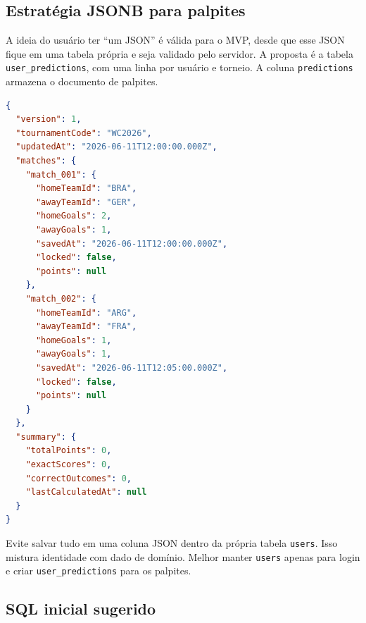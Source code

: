 \documentclass[12pt,a4paper]{article}
\begin{document}
\subsection{Estratégia JSONB para palpites}

A ideia do usuário ter ``um JSON'' é válida para o MVP, desde que esse JSON fique em uma tabela própria e seja validado pelo servidor. A proposta é a tabela \texttt{user\_predictions}, com uma linha por usuário e torneio. A coluna \texttt{predictions} armazena o documento de palpites.

\begin{lstlisting}[language=json,caption={Formato proposto do JSON de palpites}]
{
  "version": 1,
  "tournamentCode": "WC2026",
  "updatedAt": "2026-06-11T12:00:00.000Z",
  "matches": {
    "match_001": {
      "homeTeamId": "BRA",
      "awayTeamId": "GER",
      "homeGoals": 2,
      "awayGoals": 1,
      "savedAt": "2026-06-11T12:00:00.000Z",
      "locked": false,
      "points": null
    },
    "match_002": {
      "homeTeamId": "ARG",
      "awayTeamId": "FRA",
      "homeGoals": 1,
      "awayGoals": 1,
      "savedAt": "2026-06-11T12:05:00.000Z",
      "locked": false,
      "points": null
    }
  },
  "summary": {
    "totalPoints": 0,
    "exactScores": 0,
    "correctOutcomes": 0,
    "lastCalculatedAt": null
  }
}
\end{lstlisting}

\begin{riskbox}
Evite salvar tudo em uma coluna JSON dentro da própria tabela \texttt{users}. Isso mistura identidade com dado de domínio. Melhor manter \texttt{users} apenas para login e criar \texttt{user\_predictions} para os palpites.
\end{riskbox}

\subsection{SQL inicial sugerido}
\end{document}
